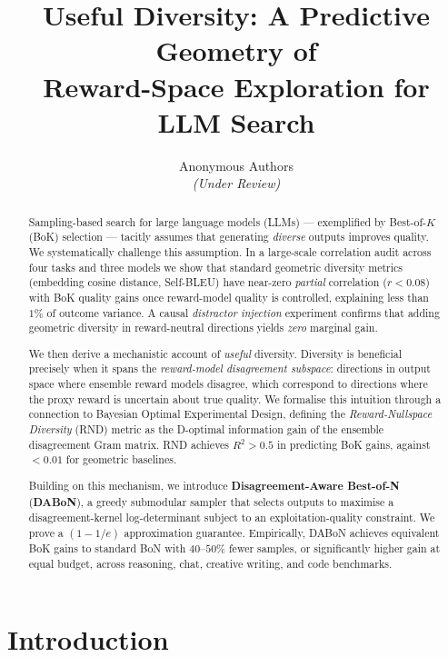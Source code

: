 \documentclass{article}
\title{Useful Diversity: A Predictive Geometry of\\
Reward-Space Exploration for LLM Search}
\author{%
  Anonymous Authors\\
  \textit{(Under Review)}
}
\begin{document}
\maketitle

\begin{abstract}
Sampling-based search for large language models (LLMs) --- exemplified by
Best-of-$K$ (BoK) selection --- tacitly assumes that generating \emph{diverse}
outputs improves quality.  We systematically challenge this assumption.
In a large-scale correlation audit across four tasks and three models we
show that standard geometric diversity metrics (embedding cosine distance,
Self-BLEU) have near-zero \emph{partial} correlation ($r<0.08$) with BoK
quality gains once reward-model quality is controlled, explaining less than
$1\%$ of outcome variance.  A causal \emph{distractor injection} experiment
confirms that adding geometric diversity in reward-neutral directions yields
\emph{zero} marginal gain.

We then derive a mechanistic account of \emph{useful} diversity.
Diversity is beneficial precisely when it spans the
\emph{reward-model disagreement subspace}: directions in output space where
ensemble reward models disagree, which correspond to directions where the
proxy reward is uncertain about true quality.  We formalise this intuition
through a connection to Bayesian Optimal Experimental Design, defining the
\emph{Reward-Nullspace Diversity} (RND) metric as the D-optimal information
gain of the ensemble disagreement Gram matrix.  RND achieves $R^{2}>0.5$ in
predicting BoK gains, against $<0.01$ for geometric baselines.

Building on this mechanism, we introduce
\textbf{Disagreement-Aware Best-of-N} (\textbf{DABoN}), a greedy submodular
sampler that selects outputs to maximise a disagreement-kernel log-determinant
subject to an exploitation-quality constraint.  We prove a $(1-1/e)$
approximation guarantee.  Empirically, DABoN achieves equivalent BoK gains
to standard BoN with $40$--$50\%$ fewer samples, or significantly higher gain
at equal budget, across reasoning, chat, creative writing, and code benchmarks.
\end{abstract}

\section{Introduction}
\label{sec:intro}
\end{document}
